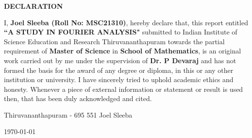 \begin{center}
  {\Large{\bf{DECLARATION}}}
\end{center}

\vspace{2em}

I, \textbf{Joel Sleeba (Roll No: MSC21310)}, hereby declare that, this report entitled \textbf{``A STUDY IN FOURIER ANALYSIS"} submitted to Indian Institute of Science Education and Research Thiruvananthapuram towards the partial requirement of \textbf{Master of Science} in \textbf{School of Mathematics}, is an original work carried out by me under the supervision of \textbf{Dr. P Devaraj} and has not formed the basis for the award of any degree or diploma, in this or any other institution or university. I have sincerely tried to uphold academic ethics and honesty. Whenever a piece of external information or statement or result is used then, that has been duly acknowledged and cited.

\vspace{3em} %

\noindent Thiruvananthapuram - 695 551 \hfill Joel Sleeba

\noindent \today \hfill

\clearpage
